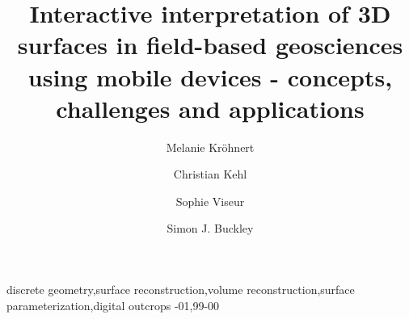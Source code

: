\documentclass[review]{elsarticle}
\begin{document}
\setlength\emergencystretch{1.5em}

\begin{frontmatter}

\title{Interactive interpretation of 3D surfaces in field-based geosciences using mobile devices - concepts, challenges and applications}



\author[tudresden]{Melanie Kr\"{o}hnert}

\author[dtu]{Christian Kehl}


\author[cerege]{Sophie Viseur}

\author[uniresearch,uib]{Simon J. Buckley}

\address[tudresden]{Institute for Photogrammetry \& Remote Sensing, TU Dresden, Helmholtzstr. 10, 01069 Dresden, Germany}
\address[cerege]{Aix Marseille Universit\'{e}, CNRS, IRD, CEREGE UM 34, Dept. Sedimentary and Reservoir Systems, 13001 Marseille, France}
\address[uniresearch]{Uni Research AS -- CIPR, Nyg{\aa}rdsgaten 112, 5008 Bergen, Norway}
\address[uib]{Department of Earth Science, University of Bergen, All\'{e}gaten 41, 5007 Bergen, Norway}
\address[dtu]{Danmarks Tekniske Universitet, DTU Compute, Richard Petersens Plads, Building 321/208, 2800 Kongens Lyngby, Denmark}


\begin{abstract}

\end{abstract}



\begin{keyword}
discrete geometry\sep surface reconstruction\sep volume reconstruction\sep surface parameterization\sep digital outcrops
-01\sep  99-00
\end{keyword}

\end{frontmatter}
\end{document}
